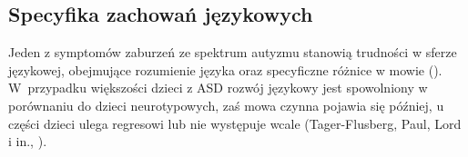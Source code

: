     
    
    
    
    
    \subsection{Specyfika zachowań językowych}
    Jeden z symptomów zaburzeń ze spektrum autyzmu stanowią trudności w sferze językowej, obejmujące rozumienie języka oraz specyficzne różnice w mowie (\cite{frith2008autyzm}).
    W~przypadku większości dzieci z ASD rozwój językowy jest spowolniony w porównaniu do dzieci neurotypowych, zaś mowa czynna pojawia się później, u części dzieci ulega regresowi lub nie występuje wcale (Tager-Flusberg, Paul, Lord i in., \cite*{tager2005language}).
    
